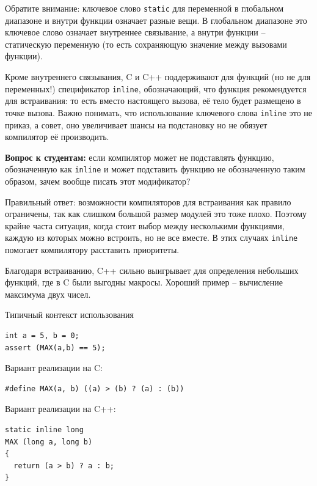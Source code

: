 \documentclass[a4paper,12pt,oneside]{article}
\newif\ifanswers
\begin{document}
Обратите внимание: ключевое слово \lstinline!static! для переменной в глобальном диапазоне и внутри функции означает разные вещи. В глобальном диапазоне это ключевое слово означает внутреннее связывание, а внутри функции -- статическую переменную (то есть сохраняющую значение между вызовами функции).

Кроме внутреннего связывания, C и C++ поддерживают для функций (но не для переменных!) спецификатор \lstinline!inline!, обозначающий, что функция рекомендуется для встраивания: то есть вместо настоящего вызова, её тело будет размещено в точке вызова. Важно понимать, что использование ключевого слова \lstinline!inline! это не приказ, а совет, оно увеличивает шансы на подстановку но не обязует компилятор её производить.

\textbf{Вопрос к студентам:} если компилятор может не подставлять функцию, обозначенную как \lstinline!inline! и может подставить функцию не обозначенную таким образом, зачем вообще писать этот модификатор?

\ifanswers
Возможный ответ: \lstinline!inline! позволяет определение функции в каждом модуле (но увы это можно парировать тем, что для этого есть \lstinline!static!)
\fi

Правильный ответ: возможности компиляторов для встраивания как правило ограничены, так как слишком большой размер модулей это тоже плохо. Поэтому крайне часта ситуация, когда стоит выбор между несколькими функциями, каждую из которых можно встроить, но не все вместе. В этих случаях \lstinline!inline! помогает компилятору расставить приоритеты.

Благодаря встраиванию, C++ сильно выигрывает для определения небольших функций, где в C были выгодны макросы. Хороший пример -- вычисление максимума двух чисел.

Типичный контекст использования

\begin{lstlisting}
int a = 5, b = 0;
assert (MAX(a,b) == 5);
\end{lstlisting}

Вариант реализации на C:

\begin{lstlisting}
#define MAX(a, b) ((a) > (b) ? (a) : (b))
\end{lstlisting}

Вариант реализации на C++:

\begin{lstlisting}
static inline long
MAX (long a, long b)
{
  return (a > b) ? a : b;
} 
\end{lstlisting}
\end{document}
